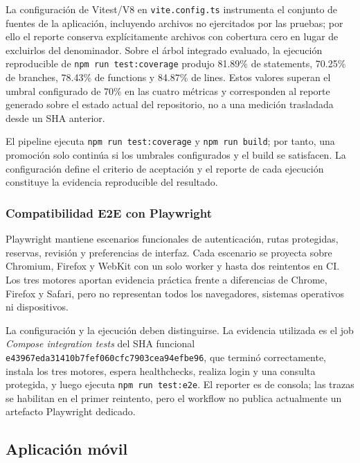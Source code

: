 La configuración de Vitest/V8 en \texttt{vite.config.ts} instrumenta el conjunto
de fuentes de la aplicación, incluyendo archivos no ejercitados por las pruebas;
por ello el reporte conserva explícitamente archivos con cobertura cero en lugar
de excluirlos del denominador. Sobre el árbol integrado evaluado, la ejecución
reproducible de \texttt{npm run test:coverage} produjo 81.89\% de statements,
70.25\% de branches, 78.43\% de functions y 84.87\% de lines. Estos valores
superan el umbral configurado de 70\% en las cuatro métricas y corresponden al
reporte generado sobre el estado actual del repositorio, no a una medición
trasladada desde un SHA anterior.

El pipeline ejecuta \texttt{npm run test:coverage} y \texttt{npm run build}; por
tanto, una promoción solo continúa si los umbrales configurados y el build se
satisfacen. La configuración define el criterio de aceptación y el reporte de
cada ejecución constituye la evidencia reproducible del resultado.

\subsubsection{Compatibilidad E2E con Playwright}

Playwright mantiene escenarios funcionales de autenticación, rutas protegidas,
reservas, revisión y preferencias de interfaz. Cada escenario se proyecta sobre
Chromium, Firefox y WebKit con un
solo worker y hasta dos reintentos en CI. Los tres motores aportan evidencia
práctica frente a diferencias de Chrome, Firefox y Safari, pero no representan
todos los navegadores, sistemas operativos ni dispositivos.

La configuración y la ejecución deben distinguirse. La evidencia utilizada es
el job \emph{Compose integration tests} del SHA funcional
\texttt{e43967eda31410b7fef060cfc7903cea94efbe96}, que terminó correctamente,
instala los tres motores, espera healthchecks, realiza login y una consulta
protegida, y luego ejecuta \texttt{npm run test:e2e}. El reporter es de consola;
las trazas se habilitan en el primer reintento, pero el workflow no publica
actualmente un artefacto Playwright dedicado.

\subsection{Aplicación móvil}
\label{subsec:pruebas-mobile}

